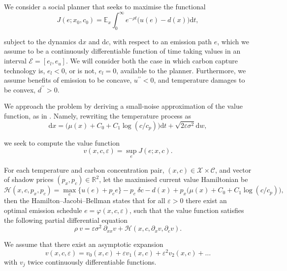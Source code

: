 \documentclass[../../main.tex]{subfiles}
\begin{document}
We consider a social planner that seeks to maximise the functional \begin{equation}
    J(e; x_0, c_0) = \mathbb{E}_{x} \int^{\infty}_0 e^{-\rho t} \Big(u(e) - d(x)\Big) \text{d} t,
\end{equation}

subject to the dynamics $\text{d}x$ and $\text{d}c$, with respect to an emission path $e$, which we assume to be a continuously differentiable function of time taking values in an interval $\mathcal{E} = [e_l, e_u]$. We will consider both the case in which carbon capture technology is, $e_l < 0$, or is not, $e_l = 0$, available to the planner. Furthermore, we assume benefits of emission to be concave, $u^{\prime \prime} < 0$, and temperature damages to be convex, $d^{\prime \prime} > 0$.

We approach the problem by deriving a small-noise approximation of the value function, as in . Namely, rewriting the temperature process as \begin{equation}
    \text{d} x = \Big(\mu(x) + C_0 + C_1 \log(c / c_p)\Big) \text{d} t + \sqrt{2\varepsilon \sigma^2} \text{d}w,
\end{equation}

we seek to compute the value function \begin{equation}
    v(x, c, \varepsilon) = \sup_{e} J(e; x, c).
\end{equation}

For each temperature and carbon concentration pair, $(x, c) \in \mathcal{X} \times \mathcal{C}$, and vector of shadow prices $(p_x, p_c) \in \mathbb{R}^2$, let the maximised current value Hamiltonian be \begin{equation}
    \mathcal{H}(x, c, p_x, p_c) = \max_e \Big\{u(e) + p_c e \Big\} - p_c \ \delta c - d(x) + p_x \Big(\mu(x) + C_0 + C_1 \log(c / c_p)\Big),
\end{equation} then the Hamilton–Jacobi–Bellman states that for all $\varepsilon > 0$ there exist an optimal emission schedule $e = \varphi(x, c, \varepsilon)$, such that the value function satisfies the following partial differential equation \begin{equation} \label{eq:hbj}
    \rho \ v = \varepsilon \sigma^2 \ \partial_{x x} v + \mathcal{H}(x, c, \partial_x v, \partial_c v).
\end{equation}

We assume that there exist an asymptotic expansion \begin{equation}
    v(x, c, \varepsilon) = v_0(x, c) + \varepsilon v_1(x, c) + \varepsilon^2 v_2(x, c) + \ldots
\end{equation} with $v_j$ twice continuously differentiable functions.
\end{document}
